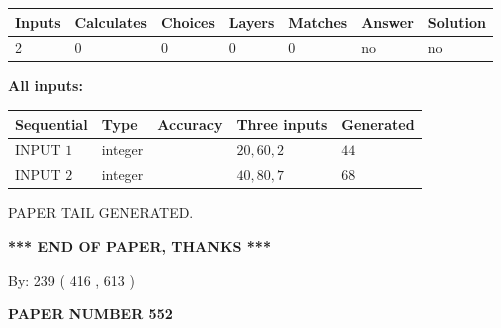 \documentclass[12pt]{article}
\begin{document}
   
   
   
\noindent\begin{tabular}{|l|l|l|l|l|l|l|}
 \hline
Inputs & Calculates & Choices & Layers & Matches & Answer & Solution \\ \hline
 2  & 
 0  & 
 0
  & 
 0  & 
 0  & 
  no & 
  no 
  \\ \hline
 \end{tabular}
   
   
   
   
\noindent{}
   
   
   
   
\noindent\vspace{0.1in}\hspace{-0.08in} {\textbf{\Large{All inputs: }}}
   
   
  
  
\noindent\begin{tabular}{|l|l|l|l|l|}
\hline
 Sequential & Type & Accuracy & Three inputs & Generated \\ 
\hline
 
 
  INPUT $  1 $ & integer &  & $
 20
 , 
 60
 , 
 2
 $ & $ 44 $ 
 \\  \hline  
 
 
  INPUT $  2 $ & integer &  & $
 40
 , 
 80
 , 
 7
 $ & $ 68 $ 
 \\  \hline  
 \end{tabular}
   
   
   
   
   
   
 \vspace{0.2in}
 
   
   
\vspace{2.0in} PAPER TAIL GENERATED.
   
   
   
   
\vspace{1.0in} 
{\textbf{\large{ *** END OF PAPER, THANKS *** }}} 
   
   
\hspace{1.0in} By: 
 239 ( 416 ,  613 )
   
   
   
   
\newpage 
\setcounter{page}{ 
   552001 } 
   
   
   
   
 {\textbf{ \Large{ PAPER NUMBER  552  }}}
   
\end{document}
